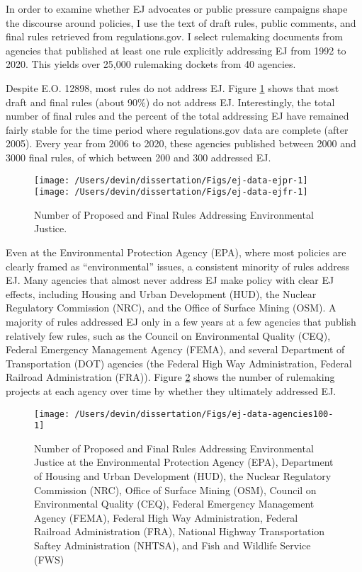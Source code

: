 \documentclass[
      12pt,
        ]{article}
\begin{document}
In order to examine whether EJ advocates or public pressure campaigns shape the discourse around policies,
I use the text of draft rules, public comments, and final rules retrieved from regulations.gov. I select rulemaking documents from agencies that published at least one rule explicitly addressing EJ from 1992 to 2020. This yields over 25,000 rulemaking dockets from 40 agencies.

Despite E.O. 12898, most rules do not address EJ. Figure \ref{fig:ej-data} shows that most draft and final rules (about 90\%) do not address EJ. Interestingly, the total number of final rules and the percent of the total addressing EJ have remained fairly stable for the time period where regulations.gov data are complete (after 2005). Every year from 2006 to 2020, these agencies published between 2000 and 3000 final rules, of which between 200 and 300 addressed EJ.

\begin{figure}

{\centering \texttt{[image: /Users/devin/dissertation/Figs/ej-data-ejpr-1]} \texttt{[image: /Users/devin/dissertation/Figs/ej-data-ejfr-1]} 

}

\caption{Number of Proposed and Final Rules Addressing Environmental Justice.}\label{fig:ej-data}
\end{figure}

Even at the Environmental Protection Agency (EPA), where most policies are clearly framed as ``environmental'' issues, a consistent minority of rules address EJ. Many agencies that almost never address EJ make policy with clear EJ effects, including Housing and Urban Development (HUD), the Nuclear Regulatory Commission (NRC), and the Office of Surface Mining (OSM). A majority of rules addressed EJ only in a few years at a few agencies that publish relatively few rules, such as the Council on Environmental Quality (CEQ), Federal Emergency Management Agency (FEMA), and several Department of Transportation (DOT) agencies (the Federal High Way Administration, Federal Railroad Administration (FRA)). Figure \ref{fig:ej-data-agencies100} shows the number of rulemaking projects at each agency over time by whether they ultimately addressed EJ.

\begin{figure}

{\centering \texttt{[image: /Users/devin/dissertation/Figs/ej-data-agencies100-1]} 

}

\caption{Number of Proposed and Final Rules Addressing Environmental Justice at the Environmental Protection Agency (EPA), Department of Housing and Urban Development (HUD), the Nuclear Regulatory Commission (NRC), Office of Surface Mining (OSM), Council on Environmental Quality (CEQ), Federal Emergency Management Agency (FEMA), Federal High Way Administration, Federal Railroad Administration (FRA), National Highway Transportation Saftey Administration (NHTSA), and Fish and Wildlife Service (FWS)}\label{fig:ej-data-agencies100}
\end{figure}
\end{document}
